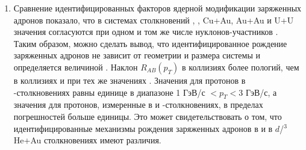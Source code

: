\begin{enumerate}
\item Сравнение идентифицированных факторов ядерной модификации заряженных адронов показало, что в системах столкновений \dau, \heau, Cu+Au, Au+Au и U+U значения \rab согласуются при одном и том же числе нуклонов-участников \Npart.
Таким образом, можно сделать вывод, что идентифицированное рождение заряженных адронов не зависит от геометрии и размера системы и определяется величиной \Npart.
Наклон $R_{AB}(p_T)$ в коллизиях \pal более пологий, чем в коллизиях \heau и \dau при тех же значениях \Npart.
Значения \rab для протонов в \pal-столкновениях равны единице в диапазоне 1 ГэВ/с $< p_T <$3 ГэВ/с, а значения \rab для протонов, измеренные в \heau и \dau-столкновениях, в пределах погрешностей больше единицы. Это может свидетельствовать о том, что идентифицированные механизмы рождения заряженных адронов в \pal и в $d$/$^{3}$He+Au столкновениях имеют различия.
\end{enumerate}
